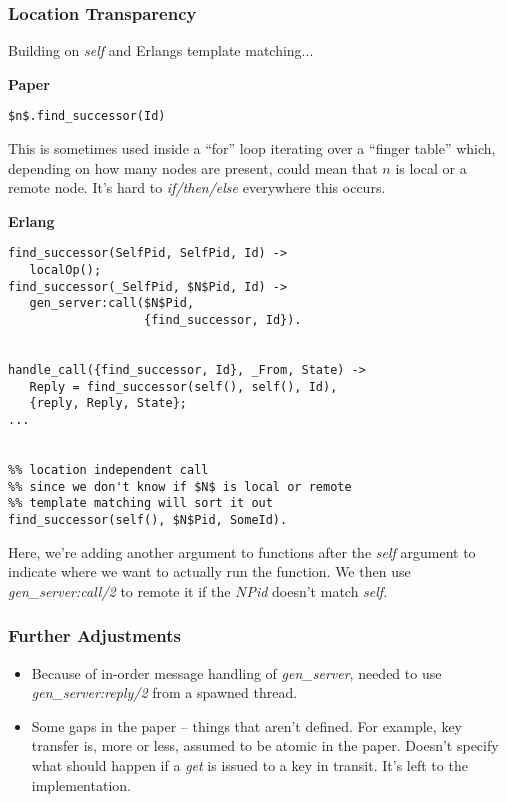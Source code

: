 \documentclass{beamer}
\begin{document}
\begin{frame}[fragile]
  \frametitle{Location Transparency}
  Building on \emph{self} and Erlangs template matching...

  \begin{multicols}{2}
    \textbf{Paper}
   \begin{lstlisting}[mathescape, style=pesudocode]
$n$.find_successor(Id)
    \end{lstlisting}
   This is sometimes used inside a ``for'' loop iterating over a
   ``finger table'' which, depending on how many nodes are present,
   could mean that $n$ is local or a remote node. It's hard to
   \emph{if/then/else} everywhere this occurs.

   \columnbreak

   \textbf{Erlang}
    \begin{lstlisting}[mathescape, style=erlang]
find_successor(SelfPid, SelfPid, Id) ->
   localOp();      
find_successor(_SelfPid, $N$Pid, Id) ->
   gen_server:call($N$Pid,
                   {find_successor, Id}).


handle_call({find_successor, Id}, _From, State) ->
   Reply = find_successor(self(), self(), Id),
   {reply, Reply, State};
...


%% location independent call
%% since we don't know if $N$ is local or remote
%% template matching will sort it out
find_successor(self(), $N$Pid, SomeId).  
    \end{lstlisting}
  \end{multicols}

  Here, we're adding another argument to functions after the
  \emph{self} argument to indicate where we want to actually run the
  function. We then use \emph{gen\_server:call/2} to remote it if the
  \emph{$N$Pid} doesn't match \emph{self}.
   
\end{frame}

\begin{frame}
  \frametitle{Further Adjustments}
  \begin{itemize}
  \item Because of in-order message handling of \emph{gen\_server},
    needed to use \emph{gen\_server:reply/2} from a spawned thread.
  \item Some gaps in the paper -- things that aren't defined. For
    example, key transfer is, more or less, assumed to be atomic in the
    paper. Doesn't specify what should happen if a \emph{get} is
    issued to a key in transit. It's left to the implementation.
  \end{itemize}
\end{frame}
\end{document}
